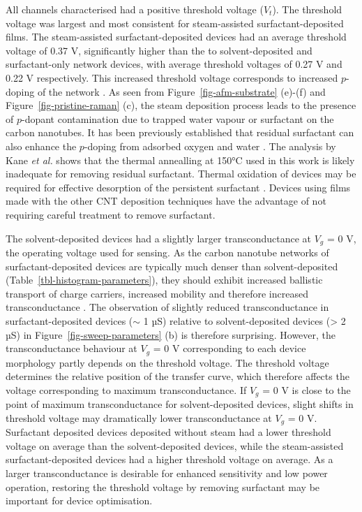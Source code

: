 \documentclass[
  a4paper,
]{scrbook}
\begin{document}
All channels characterised had a positive threshold voltage (\(V_{t}\)).
The threshold voltage was largest and most consistent for steam-assisted
surfactant-deposited films. The steam-assisted surfactant-deposited
devices had an average threshold voltage of 0.37 V, significantly higher
than the to solvent-deposited and surfactant-only network devices, with
average threshold voltages of 0.27 V and 0.22 V respectively. This
increased threshold voltage corresponds to increased \(p\)-doping of the
network \autocite{Kang2005,Heller2008,Murugathas2018}. As seen from
Figure~\ref{fig-afm-substrate} (e)-(f) and
Figure~\ref{fig-pristine-raman} (c), the steam deposition process leads
to the presence of \(p\)-dopant contamination due to trapped water
vapour or surfactant on the carbon nanotubes. It has been previously
established that residual surfactant can also enhance the \(p\)-doping
from adsorbed oxygen and water
\autocite{Kane2014,Nonoguchi2018,Christensen2022}. The analysis by Kane
\emph{et al.} shows that the thermal annealling at 150°C used in this
work is likely inadequate for removing residual surfactant. Thermal
oxidation of devices may be required for effective desorption of the
persistent surfactant \autocite{Kane2014}. Devices using films made with
the other CNT deposition techniques have the advantage of not requiring
careful treatment to remove surfactant.

The solvent-deposited devices had a slightly larger transconductance at
\(V_g\) = 0 V, the operating voltage used for sensing. As the carbon
nanotube networks of surfactant-deposited devices are typically much
denser than solvent-deposited (Table~\ref{tbl-histogram-parameters}),
they should exhibit increased ballistic transport of charge carriers,
increased mobility and therefore increased transconductance
\autocite{Rouhi2011}. The observation of slightly reduced
transconductance in surfactant-deposited devices (\(\sim\) 1 µS)
relative to solvent-deposited devices (\textgreater{} 2 µS) in
Figure~\ref{fig-sweep-parameters} (b) is therefore surprising. However,
the transconductance behaviour at \(V_g\) = 0 V corresponding to each
device morphology partly depends on the threshold voltage. The threshold
voltage determines the relative position of the transfer curve, which
therefore affects the voltage corresponding to maximum transconductance.
If \(V_g\) = 0 V is close to the point of maximum transconductance for
solvent-deposited devices, slight shifts in threshold voltage may
dramatically lower transconductance at \(V_g\) = 0 V. Surfactant
deposited devices deposited without steam had a lower threshold voltage
on average than the solvent-deposited devices, while the steam-assisted
surfactant-deposited devices had a higher threshold voltage on average.
As a larger transconductance is desirable for enhanced sensitivity and
low power operation, restoring the threshold voltage by removing
surfactant may be important for device optimisation.
\end{document}

